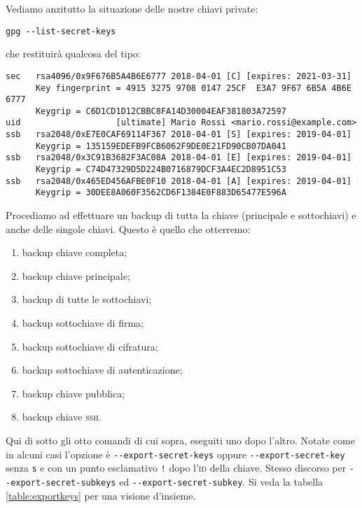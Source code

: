 Vediamo anzitutto la situazione delle nostre chiavi private:

\begin{lstlisting}
gpg --list-secret-keys
\end{lstlisting}

che restituirà qualcosa del tipo:

\begin{lstlisting}
sec   rsa4096/0x9F676B5A4B6E6777 2018-04-01 [C] [expires: 2021-03-31]
      Key fingerprint = 4915 3275 9708 0147 25CF  E3A7 9F67 6B5A 4B6E 6777
      Keygrip = C6D1CD1D12CBBC8FA14D30004EAF381803A72597
uid                   [ultimate] Mario Rossi <mario.rossi@example.com>
ssb   rsa2048/0xE7E0CAF69114F367 2018-04-01 [S] [expires: 2019-04-01]
      Keygrip = 135159EDEFB9FCB6062F9DE0E21FD90CB07DA041
ssb   rsa2048/0x3C91B3682F3AC08A 2018-04-01 [E] [expires: 2019-04-01]
      Keygrip = C74D47329D5D224B0716879DCF3A4EC2D8951C53
ssb   rsa2048/0x465ED456AFBE0F10 2018-04-01 [A] [expires: 2019-04-01]
      Keygrip = 30DEE8A060F3562CD6F1384E0F883D65477E596A
\end{lstlisting}

Procediamo ad effettuare un backup di tutta la chiave (principale e sottochiavi)
e anche delle singole chiavi. Questo è quello che otterremo:

\begin{enumerate}
 \item backup chiave completa;
 \item backup chiave principale;
 \item backup di tutte le sottochiavi;
 \item backup sottochiave di firma;
 \item backup sottochiave di cifratura;
 \item backup sottochiave di autenticazione;
 \item backup chiave pubblica;
 \item backup chiave \textsc{ssh}.
\end{enumerate}

Qui di sotto gli otto comandi di cui sopra, eseguiti uno dopo l'altro. Notate
come in alcuni casi l'opzione è \verb+--export-secret-keys+ oppure
\verb+--export-secret-key+ senza \texttt{s} e con un punto esclamativo
\texttt{!} dopo l'\textsc{id} della chiave. Stesso discorso per
\verb+--export-secret-subkeys+ ed \verb+--export-secret-subkey+. Si veda la
tabella \vref{table:exportkeys} per una visione d'insieme.

